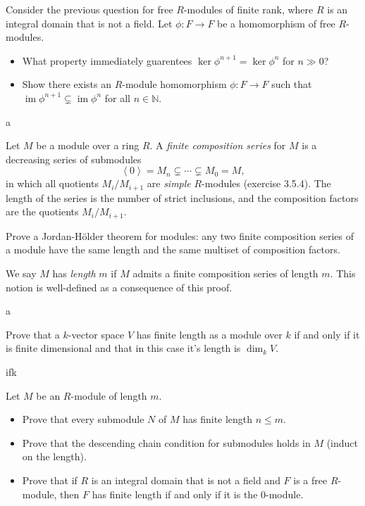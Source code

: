 \documentclass[11pt]{report}
\DeclareMathOperator{\im}{im}
\begin{document}
\begin{exercise}
	Consider the previous question for free $R$-modules of finite rank, where $R$ is an integral domain that is not a field. Let $\phi : F \to F$ be a homomorphism of free $R$-modules.
	\begin{itemize}
		\item What property immediately guarentees $\ker \phi ^{n+1} =\ker \phi ^{n} $ for $n\gg 0$?
		\item Show there exists an $R$-module homomorphism $\phi : F \to F$ such that $\im \phi ^{n+1} \subsetneq \im \phi^n$ for all $n\in\mathbb{N} $.
	\end{itemize}
\end{exercise}
\begin{solution}
	a
\end{solution}
\begin{exercise}
	Let $M$ be a module over a ring $R$. A \emph{finite composition series} for $M$ is a decreasing series of submodules
	\[
		\left\langle 0 \right\rangle =M_n \subsetneq \cdots \subsetneq M_0 = M
	,\]
	in which all quotients $M_i /M_{i+1} $ are \emph{simple} $R$-modules (exercise 3.5.4). The length of the series is the number of strict inclusions, and the composition factors are the quotients $M_i/M_{i+1} $.

	Prove a Jordan-H\"older theorem for modules: any two finite composition series of a module have the same length and the same multiset of composition factors.

	We say $M$ has \emph{length} $m$ if $M$ admits a finite composition series of length $m$. This notion is well-defined as a consequence of this proof.
\end{exercise}
\begin{solution}
	a
\end{solution}
\begin{exercise}
	Prove that a $k$-vector space $V$ has finite length as a module over $k$ if and only if it is finite dimensional and that in this case it's length is $\dim _k V$.
\end{exercise}
\begin{solution}
	ifk
\end{solution}
\begin{exercise}
	Let $M$ be an $R$-module of length $m$.
	\begin{itemize}
		\item Prove that every submodule $N$ of $M$ has finite length $n\leq m$.
		\item Prove that the descending chain condition for submodules holds in $M$ (induct on the length).
		\item Prove that if $R$ is an integral domain that is not a field and $F$ is a free $R$-module, then $F$ has finite length if and only if it is the 0-module.
	\end{itemize}
\end{exercise}
\end{document}
